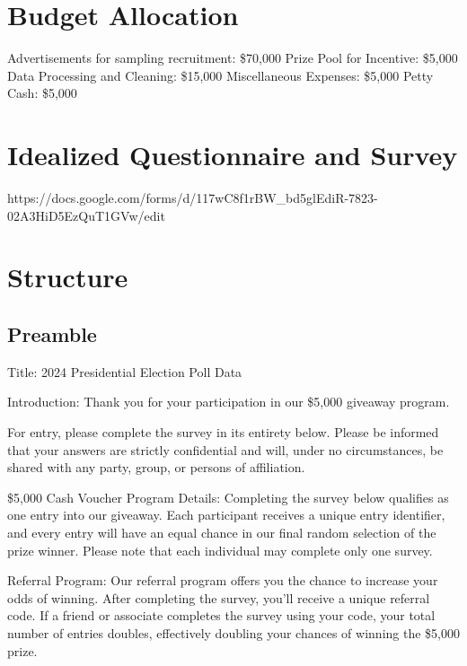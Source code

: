 \documentclass[
  letterpaper,
  DIV=11,
  numbers=noendperiod]{scrartcl}
\begin{document}
\hypertarget{budget-allocation}{%
\section{Budget Allocation}\label{budget-allocation}}

Advertisements for sampling recruitment: \$70,000 Prize Pool for
Incentive: \$5,000 Data Processing and Cleaning: \$15,000 Miscellaneous
Expenses: \$5,000 Petty Cash: \$5,000

\hypertarget{idealized-questionnaire-and-survey}{%
\section{Idealized Questionnaire and
Survey}\label{idealized-questionnaire-and-survey}}

https://docs.google.com/forms/d/117wC8f1rBW\_bd5glEdiR-7823-02A3HiD5EzQuT1GVw/edit

\hypertarget{structure}{%
\section{Structure}\label{structure}}

\hypertarget{preamble-1}{%
\subsection{Preamble}\label{preamble-1}}

Title: 2024 Presidential Election Poll Data

Introduction: Thank you for your participation in our \$5,000 giveaway
program.

For entry, please complete the survey in its entirety below. Please be
informed that your answers are strictly confidential and will, under no
circumstances, be shared with any party, group, or persons of
affiliation.

\$5,000 Cash Voucher Program Details: Completing the survey below
qualifies as one entry into our giveaway. Each participant receives a
unique entry identifier, and every entry will have an equal chance in
our final random selection of the prize winner. Please note that each
individual may complete only one survey.

Referral Program: Our referral program offers you the chance to increase
your odds of winning. After completing the survey, you'll receive a
unique referral code. If a friend or associate completes the survey
using your code, your total number of entries doubles, effectively
doubling your chances of winning the \$5,000 prize.
\end{document}

